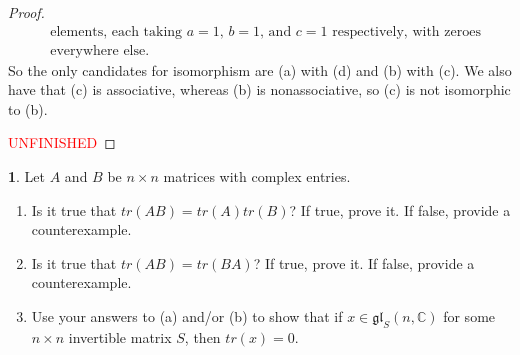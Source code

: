 \documentclass[12pt]{article}
\newcommand{\gl}{\mathfrak{gl}}
\theoremstyle{definition}
\newtheorem{ex}{}
\begin{document}
\begin{proof}
\begin{equation*}
\begin{array}{r|l}
        & \text{elements, each taking $a = 1$, $b = 1$, and $c = 1$ respectively, with zeroes}                                                   \\
                               & \text{everywhere else.}
		\end{array}
	\end{equation*}
  So the only candidates for isomorphism are (a) with (d) and (b) with (c).
  We also have that (c) is associative, whereas (b) is nonassociative, so (c) is not isomorphic to (b).

	\textcolor{red}{UNFINISHED}
\end{proof}

\begin{ex}
	Let $A$ and $B$ be $n \times n$ matrices with complex entries.
	\begin{enumerate}[label=(\alph*)]
		\item Is it true that $tr(AB) = tr(A)tr(B)$?
		      If true, prove it.
		      If false, provide a counterexample.
		\item Is it true that $tr(AB) = tr(BA)$?
		      If true, prove it.
		      If false, provide a counterexample.
		\item Use your answers to (a) and/or (b) to show that if $x \in \gl_S(n, \mathbb{C})$ for some $n \times n$ invertible matrix $S$, then $tr(x) = 0$.
	\end{enumerate}
\end{ex}
\end{document}
